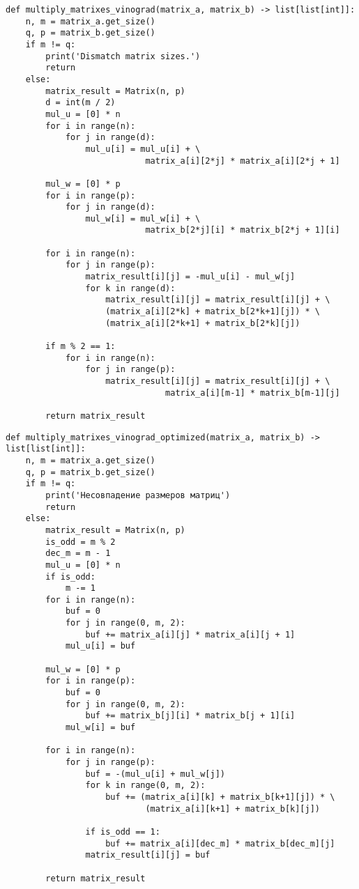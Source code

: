 \begin{lstlisting}[label=some-code,caption=Программный код умножения матриц по Винограду]
def multiply_matrixes_vinograd(matrix_a, matrix_b) -> list[list[int]]:
	n, m = matrix_a.get_size()
	q, p = matrix_b.get_size()
	if m != q:
		print('Dismatch matrix sizes.')
		return
	else:
		matrix_result = Matrix(n, p)
		d = int(m / 2)
		mul_u = [0] * n
		for i in range(n):
			for j in range(d):
				mul_u[i] = mul_u[i] + \
							matrix_a[i][2*j] * matrix_a[i][2*j + 1]
		
		mul_w = [0] * p
		for i in range(p):
			for j in range(d):
				mul_w[i] = mul_w[i] + \
							matrix_b[2*j][i] * matrix_b[2*j + 1][i]
		
		for i in range(n):
			for j in range(p):
				matrix_result[i][j] = -mul_u[i] - mul_w[j]
				for k in range(d):
					matrix_result[i][j] = matrix_result[i][j] + \
					(matrix_a[i][2*k] + matrix_b[2*k+1][j]) * \
					(matrix_a[i][2*k+1] + matrix_b[2*k][j])
		
		if m % 2 == 1:
			for i in range(n):
				for j in range(p):
					matrix_result[i][j] = matrix_result[i][j] + \
								matrix_a[i][m-1] * matrix_b[m-1][j]
		
		return matrix_result
\end{lstlisting}

\begin{lstlisting}[label=some-code,caption=Программный код оптимизированного алгоритма умножения матриц по Винограду]
def multiply_matrixes_vinograd_optimized(matrix_a, matrix_b) -> list[list[int]]:
	n, m = matrix_a.get_size()
	q, p = matrix_b.get_size()
	if m != q:
		print('Несовпадение размеров матриц')
		return
	else:
		matrix_result = Matrix(n, p)
		is_odd = m % 2
		dec_m = m - 1
		mul_u = [0] * n
		if is_odd:
			m -= 1
		for i in range(n):
			buf = 0
			for j in range(0, m, 2):
				buf += matrix_a[i][j] * matrix_a[i][j + 1]
			mul_u[i] = buf
		
		mul_w = [0] * p
		for i in range(p):
			buf = 0
			for j in range(0, m, 2):
				buf += matrix_b[j][i] * matrix_b[j + 1][i]
			mul_w[i] = buf
		
		for i in range(n):
			for j in range(p):
				buf = -(mul_u[i] + mul_w[j])
				for k in range(0, m, 2):
					buf += (matrix_a[i][k] + matrix_b[k+1][j]) * \
							(matrix_a[i][k+1] + matrix_b[k][j])
		
				if is_odd == 1:
					buf += matrix_a[i][dec_m] * matrix_b[dec_m][j]
				matrix_result[i][j] = buf
		
		return matrix_result
\end{lstlisting}

